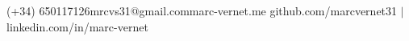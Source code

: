 
  {(+34) 650117126}{mrcvs31@gmail.com}{marc-vernet.me}
  {github.com/marcvernet31 \quad $|$ \quad linkedin.com/in/marc-vernet}
